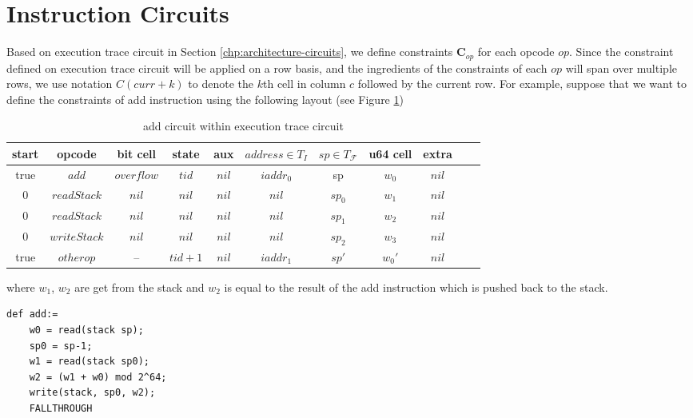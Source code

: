 \section{Instruction Circuits}
\label{chp:instruction-circuits}
Based on execution trace circuit in Section \ref{chp:architecture-circuits}, we define constraints $\mathbf{C}_{op}$ for each opcode $op$. Since the constraint defined on execution trace circuit will be applied on a row basis, and the ingredients of the constraints of each $op$ will span over multiple rows, we use notation $C(curr+k)$ to denote the $k$th cell in column $c$ followed by the current row. For example, suppose that we want to define the constraints of add instruction using the following layout (see Figure \ref{tbl:add-instruction})
\begin{table}[h]
\begin{center}
\begin{tabular}{ | c | c | c | c | c | c | c | c | c | c | c | }
  \hline
  start & opcode & bit cell & state & aux & $address \in T_{I}$ & $sp \in T_\mathcal{F}$& u64 cell & extra \\ 
  \hline
   true & $add$ & $overflow$ & $tid$ & $nil$ & $iaddr_0$ & sp & $w_0$ & $nil$\\ 
 \hline
   0 & $readStack$ & $nil$ & $nil$ & $nil$ & $nil$ & $sp_0$ & $w_1$ & $nil$\\ 
 \hline
   0 & $readStack$ & $nil$ & $nil$ & $nil$ & $nil$ & $sp_1$ & $w_2$ & $nil$\\ 
 \hline
   0 & $writeStack$ & $nil$ & $nil$ & $nil$ & $nil$ & $sp_2$ & $w_3$ & $nil$\\ 
 \hline
   true & $otherop$ & -- & $tid+1$ & $nil$ & $iaddr_1$ & $sp'$ & $w_0'$ & $nil$\\
 \hline
\end{tabular}
\caption{add circuit within execution trace circuit}
\label{tbl:add-instruction}
\end{center}
\end{table}

\noindent where $w_1$, $w_2$ are get from the stack and $w_2$ is equal to the result of the add instruction which is pushed back to the stack.
\begin{verbatim}
def add:=
    w0 = read(stack sp);
    sp0 = sp-1;
    w1 = read(stack sp0);
    w2 = (w1 + w0) mod 2^64;
    write(stack, sp0, w2);
    FALLTHROUGH
\end{verbatim}

